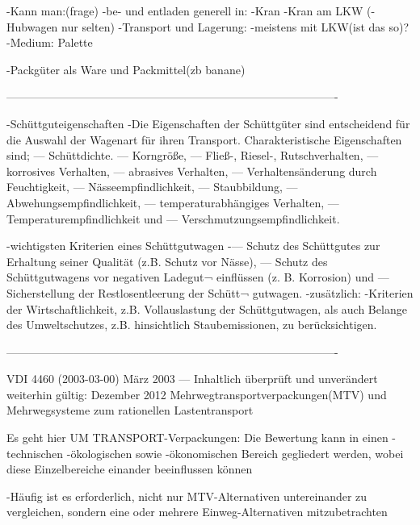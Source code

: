  -Kann man:(frage)
    -be- und entladen generell in:
        -Kran
        -Kran am LKW
        (-Hubwagen nur selten)
     -Transport und Lagerung:
        -meistens mit LKW(ist das so)?
        -Medium: Palette
        
-Packgüter als Ware und Packmittel(zb banane)
        
----------------------------------------------------------------------------------------


-Schüttguteigenschaften
    -Die Eigenschaften der Schüttgüter sind entscheidend für die
Auswahl der Wagenart für ihren Transport.
Charakteristische Eigenschaften sind;
— Schüttdichte.
— Korngröße,
— Fließ-, Riesel-, Rutschverhalten,
— korrosives Verhalten,
— abrasives Verhalten,
— Verhaltensänderung durch Feuchtigkeit,
— Nässeempfindlichkeit,
— Staubbildung,
— Abwehungsempfindlichkeit,
— temperaturabhängiges Verhalten,
— Temperaturempfindlichkeit und
— Verschmutzungsempfindlichkeit.

    -wichtigsten Kriterien eines Schüttgutwagen
        -— Schutz des Schüttgutes zur Erhaltung seiner Qualität
(z.B. Schutz vor Nässe),
— Schutz des Schüttgutwagens vor negativen Ladegut¬
einflüssen (z. B. Korrosion) und
— Sicherstellung der Restlosentleerung der Schütt¬
gutwagen.
    -zusätzlich:
        -Kriterien der Wirtschaftlichkeit, z.B. Vollauslastung der Schüttgutwagen, als auch Belange des Umweltschutzes, z.B. hinsichtlich Staubemissionen, zu berücksichtigen.
    
----------------------------------------------------------------------------------------
    
VDI 4460 (2003-03-00) März 2003 --- Inhaltlich überprüft und unverändert weiterhin gültig: Dezember 2012
Mehrwegtransportverpackungen(MTV) und Mehrwegsysteme zum rationellen Lastentransport

Es geht hier UM TRANSPORT-Verpackungen:
    Die Bewertung kann in einen
    -technischen
    -ökologischen sowie
    -ökonomischen
    Bereich gegliedert werden, wobei diese Einzelbereiche einander beeinflussen können

    -Häufig ist es erforderlich, nicht nur MTV-Alternativen untereinander zu vergleichen, sondern eine oder mehrere Einweg-Alternativen mitzubetrachten
    
